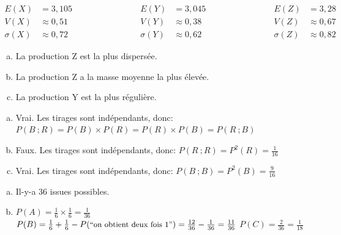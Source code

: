 \documentclass[12pt, a4paper]{article}
\begin{document}
    \begin{Exercise}
      \begin{equation*}
        \begin{aligned}
          E(X)&= 3{,}105 \\ V(X)&\approx 0{,}51 \\ \sigma(X)&\approx 0{,}72
        \end{aligned}
        \hspace{3cm}
        \begin{aligned}
          E(Y)&=3{,}045 \\ V(Y)&\approx 0{,}38 \\ \sigma(Y)&\approx 0{,}62
        \end{aligned}
        \hspace{3cm}
        \begin{aligned}
          E(Z)&=3{,}28 \\ V(Z)&\approx 0{,}67 \\ \sigma(Z)&\approx 0{,}82
        \end{aligned}
      \end{equation*} \bigbreak
      \begin{enumerate}[a)]
        \item La production Z est la plus dispersée.
        \item La production Z a la masse moyenne la plus élevée.
        \item La production Y est la plus régulière.
      \end{enumerate}
    \end{Exercise}

    \begin{Exercise}[number={64}]
      \begin{enumerate}[a)]
        \item Vrai. Les tirages sont indépendants, donc: $P(B\ ;R)=P(B)\times P(R)=P(R)\times P(B)=P(R\ ;B)$
        \item Faux. Les tirages sont indépendants, donc: $P(R\ ;R)=P^2(R)=\frac{1}{16}$
        \item Vrai. Les tirages sont indépendants, donc: $P(B\ ;B)=P^2(B)=\frac{9}{16}$
      \end{enumerate}
    \end{Exercise}

    \begin{Exercise}[number={65}]
      \begin{enumerate}[a)]
        \item Il-y-a 36 issues possibles.
        \item $P(A)=\frac{1}{6}\times\frac{1}{6}=\frac{1}{36}$ \smallbreak
              $P(B)=\frac{1}{6}+\frac{1}{6}-P(\text{\small{``on obtient deux fois 1''}})=\frac{12}{36}-\frac{1}{36}=\frac{11}{36}$ \smallbreak
              $P(C)=\frac{2}{36}=\frac{1}{18}$ 
      \end{enumerate}
    \end{Exercise}
\end{document}
